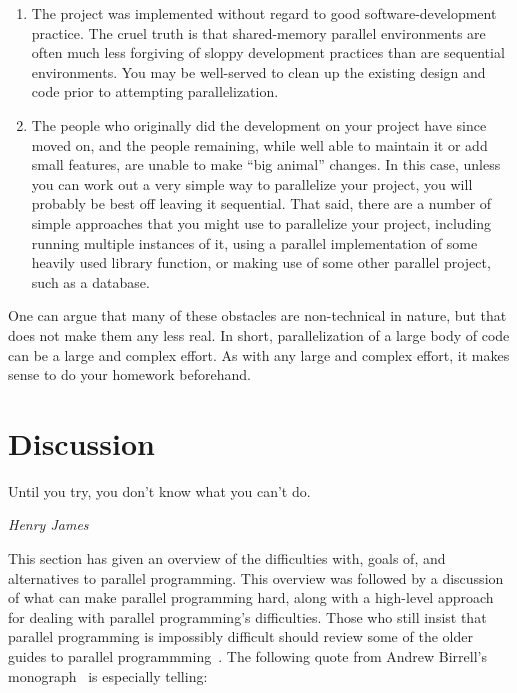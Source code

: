 {\begin{enumerate}
		ran only on sequential hardware for most of its lifetime,
		then your project undoubtably has at least its share of
		parallel-unfriendly code.
	\item	The project was implemented without regard to good
		software-development practice.
		The cruel truth is that shared-memory parallel
		environments are often much less forgiving of sloppy
		development practices than are sequential environments.
		You may be well-served to clean up the existing design
		and code prior to attempting parallelization.
	\item	The people who originally did the development on your
		project have since moved on, and the people remaining,
		while well able to maintain it or add small features,
		are unable to make ``big animal'' changes.
		In this case, unless you can work out a very simple
		way to parallelize your project, you will probably
		be best off leaving it sequential.
		That said, there are a number of simple approaches that
		you might use
		to parallelize your project, including running multiple
		instances of it, using a parallel implementation of
		some heavily used library function, or making use of
		some other parallel project, such as a database.
	\end{enumerate}

	One can argue that many of these obstacles are non-technical
	in nature, but that does not make them any less real.
	In short, parallelization of a large body of code
	can be a large and complex effort.
	As with any large and complex effort, it makes sense to
	do your homework beforehand.
}\QuickQuizEnd

\section{Discussion}
\label{sec:intro:Discussion}
%
\epigraph{Until you try, you don't know what you can't do.}
	 {\emph{Henry James}}

This section has given an overview of the difficulties with, goals of,
and alternatives to parallel programming.
This overview was followed by a discussion of
what can make parallel programming hard, along with a high-level
approach for dealing with parallel programming's difficulties.
Those who still insist that parallel programming is impossibly difficult
should review some of the older guides to parallel
programmming~\cite{SQNTParallel,AndrewDBirrell1989Threads,Beck85,Inman85}.
The following quote from Andrew Birrell's
monograph~\cite{AndrewDBirrell1989Threads} is especially telling:

